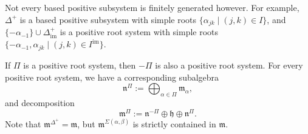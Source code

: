 \documentclass[11pt,letterpaper]{amsart}
\newcounter{thecounter}
\numberwithin{thecounter}{section}
\newtheorem{lemma}[thecounter]{Lemma}
\theoremstyle{definition}
\DeclareMathOperator{\im}{{im}}
\renewcommand{\a}{\alpha}
\renewcommand{\b}{\beta}
\newcommand{\R}{{\mathbb R}}
\newcommand{\Q}{{\mathbb Q}}
\newcommand{\m}{{\mathfrak{m}}}
\begin{document}
Not every based positive subsystem is finitely generated however.
For example, $\Delta^+$ is a based positive subsystem with simple roots
$\{\a_{jk} \mid (j,k)\in I\}$, and  $\{-\a_{-1}\}\cup\Delta^+_{\im}$ is a positive root system with simple roots
$\{-\a_{-1},\a_{jk} \mid (j,k)\in I^{\im}\}$.



If $\Pi$ is a positive root system, then $-\Pi$ is also a positive root system.
For every positive root system, we have a corresponding subalgebra
$$
  \mathfrak{n}^\Pi := \bigoplus_{\a\in\Pi} \mathfrak{m}_\a,
$$
and decomposition
$$
  \m^\Pi := \mathfrak{n}^{-\Pi}\oplus\mathfrak{h}\oplus \mathfrak{n}^\Pi .
$$
Note that $\m^{\Delta^+}=\m$, but $\m^{\Sigma(\a,\b)}$ is strictly contained in $\m$.







\end{document}
